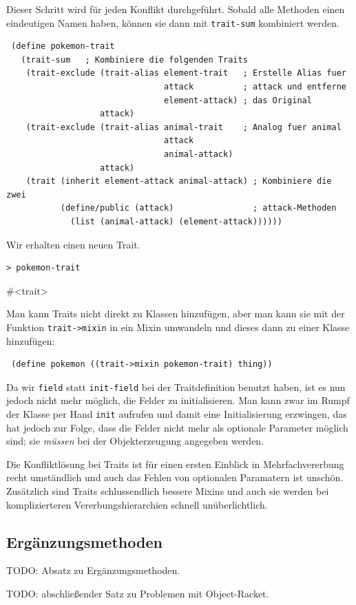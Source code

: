 Dieser Schritt wird für jeden Konflikt durchgeführt. Sobald alle Methoden einen eindeutigen Namen haben, können sie dann mit \texttt{trait-sum} kombiniert werden.

\begin{lstlisting}
 (define pokemon-trait
   (trait-sum   ; Kombiniere die folgenden Traits
    (trait-exclude (trait-alias element-trait   ; Erstelle Alias fuer
                                attack          ; attack und entferne
                                element-attack) ; das Original
                   attack)
    (trait-exclude (trait-alias animal-trait    ; Analog fuer animal
                                attack         
                                animal-attack)
                   attack)
    (trait (inherit element-attack animal-attack) ; Kombiniere die zwei
           (define/public (attack)                ; attack-Methoden
             (list (animal-attack) (element-attack))))))
\end{lstlisting}

Wir erhalten einen neuen Trait. 

\begin{lstlisting}
> pokemon-trait
\end{lstlisting}
{\routput \#<trait>}

Man kann Traits nicht direkt zu Klassen hinzufügen, aber man kann sie mit der Funktion \texttt{trait->mixin} in ein Mixin umwandeln und dieses dann zu einer Klasse hinzufügen:

\begin{lstlisting}
 (define pokemon ((trait->mixin pokemon-trait) thing))
\end{lstlisting}

Da wir \texttt{field} statt \texttt{init-field} bei der Traitdefinition benutzt haben, ist es nun jedoch nicht mehr möglich, die Felder zu initialisieren. Man kann zwar im Rumpf der Klasse per Hand \texttt{init} aufrufen und damit eine Initialisierung erzwingen, das hat jedoch zur Folge, dass die Felder nicht mehr als optionale Parameter möglich sind; sie \textit{müssen} bei der Objekterzeugung angegeben werden.

Die Konfliktlösung bei Traits ist für einen ersten Einblick in Mehrfachvererbung recht umständlich und auch das Fehlen von optionalen Paramatern ist unschön. Zusätzlich sind Traits schlussendlich bessere Mixins und auch sie werden bei komplizierteren Vererbungshierarchien schnell unüberlichtlich.

\subsection{Ergänzungsmethoden}

TODO: Absatz zu Ergänzungsmethoden. %

TODO: abschließender Satz zu Problemen mit Object-Racket. %

